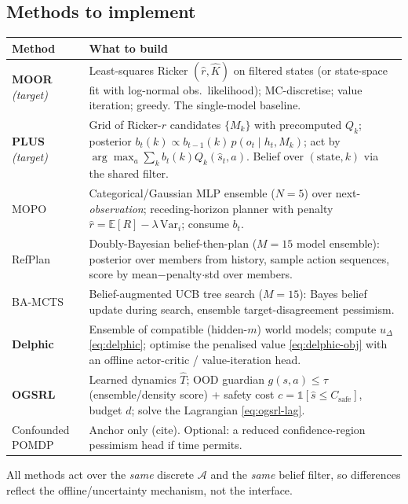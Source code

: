 \documentclass[11pt]{article}
\newcommand{\Csafe}{C_{\mathrm{safe}}}
\begin{document}
\subsection{Methods to implement}
\begin{longtable}{@{}p{2.4cm}p{12.4cm}@{}}
\toprule
Method & What to build \\
\midrule
\textbf{MOOR} \emph{(target)} & Least-squares Ricker $(\hat r,\hat K)$ on filtered states (or state-space fit with log-normal obs.\ likelihood); MC-discretise; value iteration; greedy. The single-model baseline. \\
\textbf{PLUS} \emph{(target)} & Grid of Ricker-$r$ candidates $\{M_k\}$ with precomputed $Q_k$; posterior $b_t(k)\!\propto\! b_{t-1}(k)\,p(o_t\mid h_t,M_k)$; act by $\arg\max_a\sum_k b_t(k)Q_k(\hat s_t,a)$. Belief over $(\text{state},k)$ via the shared filter. \\
MOPO & Categorical/Gaussian MLP ensemble ($N{=}5$) over next-\emph{observation}; receding-horizon planner with penalty $\hat r=\mathbb{E}[R]-\lambda\,\mathrm{Var}_i$; consume $b_t$. \\
RefPlan & Doubly-Bayesian belief-then-plan ($M{=}15$ model ensemble): posterior over members from history, sample action sequences, score by mean$-$penalty$\cdot$std over members. \\
BA-MCTS & Belief-augmented UCB tree search ($M{=}15$): Bayes belief update during search, ensemble target-disagreement pessimism. \\
\textbf{Delphic} & Ensemble of compatible (hidden-$m$) world models; compute $u_\Delta$ \eqref{eq:delphic}; optimise the penalised value \eqref{eq:delphic-obj} with an offline actor-critic / value-iteration head. \\
\textbf{OGSRL} & Learned dynamics $\widehat T$; OOD guardian $g(s,a)\!\le\!\tau$ (ensemble/density score) + safety cost $c=\mathbb{1}[\hat s\le\Csafe]$, budget $d$; solve the Lagrangian \eqref{eq:ogsrl-lag}. \\
Confounded POMDP & Anchor only (cite). Optional: a reduced confidence-region pessimism head if time permits. \\
\bottomrule
\end{longtable}
All methods act over the \emph{same} discrete $\mathcal{A}$ and the \emph{same}
belief filter, so differences reflect the offline/uncertainty mechanism, not the
interface.
\end{document}
